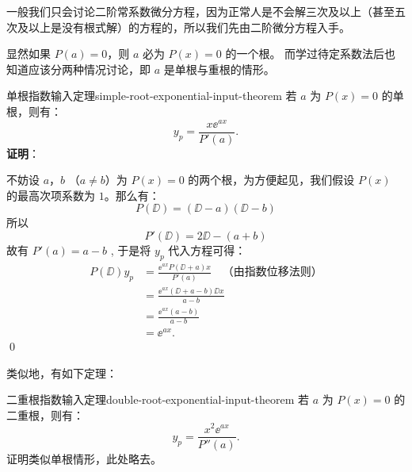 一般我们只会讨论二阶常系数微分方程，因为正常人是不会解三次及以上（甚至五次及以上是没有根式解）的方程的，所以我们先由二阶微分方程入手。

显然如果 $ P(a) = 0 $，则 $ a $ 必为 $ P(x) = 0 $ 的一个根。
而学过待定系数法后也知道应该分两种情况讨论，即 $ a $ 是单根与重根的情形。
\begin{theorem}{单根指数输入定理}{simple-root-exponential-input-theorem}
    若 $ a $ 为 $ P(x) = 0 $ 的单根，则有：
    \begin{equation}
        y_p = \frac{x \ee^{ax} }{P'(a)} .
    \end{equation}
    \textbf{证明}：

    不妨设 $ a $，$ b $ （$ a \neq  b $）为 $ P(x) = 0 $ 的两个根，为方便起见，我们假设 $ P(x) $ 的最高次项系数为 $ 1 $。那么有：
    \begin{equation*}
        P(\DD) = (\DD - a)(\DD - b)
    \end{equation*}
    所以
    \begin{equation*}
        P'(\DD) = 2\DD - (a + b)
    \end{equation*}
    故有 $ P'(a) = a - b $ , 于是将 $ y_p $ 代入方程可得：
    \begin{equation*}
        \begin{aligned}
            P(\DD) y_p & = \frac{\ee^{ax} P(\DD + a) x }{P'(a)} \quad \text{（由指数位移法则）} \\
                       & = \frac{\ee^{ax} (\DD + a - b)\DD x }{a - b}                  \\
                       & = \frac{\ee^{ax} (a - b) }{a - b}                             \\
                       & = \ee^{ax} .
        \end{aligned}
    \end{equation*}
    \qed
\end{theorem}

类似地，有如下定理：
\begin{theorem}{二重根指数输入定理}{double-root-exponential-input-theorem}
    若 $ a $ 为 $ P(x) = 0 $ 的二重根，则有：
    \begin{equation}
        y_p = \frac{x^2 \ee^{ax} }{P''(a)} .
    \end{equation}
    证明类似单根情形，此处略去。
\end{theorem}

